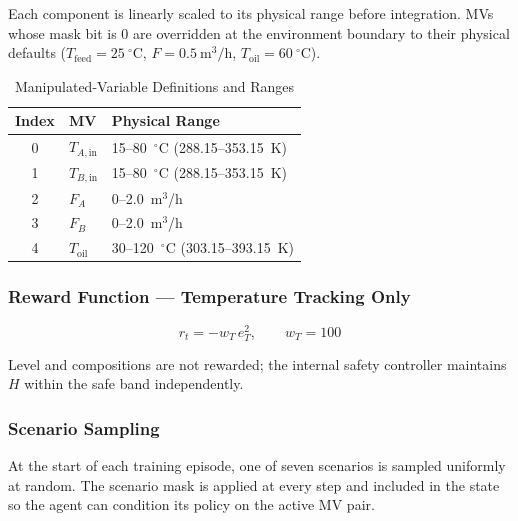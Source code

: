 \documentclass[12pt,a4paper]{article}
\begin{document}
Each component is linearly scaled to its physical range before integration.
MVs whose mask bit is 0 are overridden at the environment boundary to their
physical defaults ($T_\mathrm{feed} = 25~^\circ\mathrm{C}$,
$F = 0.5\ \mathrm{m^3/h}$, $T_\mathrm{oil} = 60~^\circ\mathrm{C}$).

\begin{table}[H]
  \centering
  \caption{Manipulated-Variable Definitions and Ranges}
  \label{tab:mvs}
  \renewcommand{\arraystretch}{1.3}
  \begin{tabular}{@{}cll@{}}
    \toprule
    \textbf{Index} & \textbf{MV} & \textbf{Physical Range} \\
    \midrule
    0 & $T_{A,\mathrm{in}}$ & 15--80~$^\circ$C \quad (288.15--353.15~K) \\
    1 & $T_{B,\mathrm{in}}$ & 15--80~$^\circ$C \quad (288.15--353.15~K) \\
    2 & $F_A$               & 0--2.0~m$^3$/h \\
    3 & $F_B$               & 0--2.0~m$^3$/h \\
    4 & $T_\mathrm{oil}$    & 30--120~$^\circ$C \quad (303.15--393.15~K) \\
    \bottomrule
  \end{tabular}
\end{table}

\subsubsection{Reward Function — Temperature Tracking Only}

\begin{equation}
  r_t = -w_T\,e_T^2, \qquad w_T = 100
  \label{eq:reward}
\end{equation}

Level and compositions are not rewarded; the internal safety controller
maintains $H$ within the safe band independently.

\subsubsection{Scenario Sampling}

At the start of each training episode, one of seven scenarios is sampled
uniformly at random. The scenario mask is applied at every step and included in
the state so the agent can condition its policy on the active MV pair.
\end{document}
